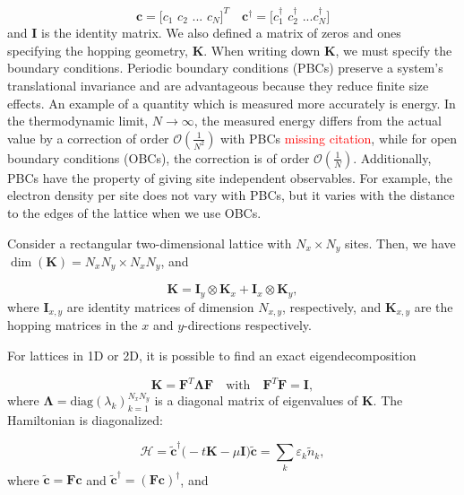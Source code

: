 \begin{equation}
\bm c = \bigg[ c_1 \,\, c_2 \,\, ... \,\, c_N \bigg]^T \quad \bm c^\dagger = \bigg[c_1^\dagger \,\, c_2^\dagger \,\, ... c_N^\dagger \bigg]
\end{equation}
and $\bm I$ is the identity matrix. We also defined a matrix of zeros and ones specifying the hopping geometry, $\bm K$. When writing down $\bm K$, we must specify the boundary conditions. Periodic boundary conditions (PBCs) preserve a system's translational invariance and are advantageous because they reduce finite size effects. An example of a quantity which is measured more accurately is energy. In the thermodynamic limit, $N \rightarrow \infty$, the measured energy differs from the actual value by a correction of order $\mathcal{O}(\frac{1}{N^2})$ with PBCs \textcolor{red}{missing citation}, while for open boundary conditions (OBCs), the correction is of order $\mathcal{O}(\frac{1}{N})$. Additionally, PBCs have the property of giving site independent observables. For example, the electron density per site does not vary with PBCs, but it varies with the distance to the edges of the lattice when we use OBCs.

Consider a rectangular two-dimensional lattice with $N_x \times N_y$ sites. Then, we have $\dim(\bm K) = N_x N_y \times N_x N_y $, and

\begin{equation}
\bm K = \bm I_y \otimes \bm K_x + \bm I_x \otimes \bm K_y ,
\end{equation}
where $\bm I_{x, y}$ are identity matrices of dimension $N_{x, y}$, respectively, and $\bm K_{x, y}$ are the hopping matrices in the $x$ and $y$-directions respectively.

For lattices in 1D or 2D, it is possible to find an exact eigendecomposition

\begin{equation}
\bm K = \bm F^T \bm \Lambda \bm F \quad \text{with}  \quad \bm F^T \bm F = \bm I ,
\end{equation}
where $\bm \Lambda = \text{diag}(\lambda_k)_{k = 1}^{N_x N_y}$ is a diagonal matrix of eigenvalues of $\bm K$. The Hamiltonian is diagonalized:

\begin{equation}\label{eq:quadraticH}
\mathcal{H} =\tilde{\bm c}^\dagger \big( -t \bm K - \mu \bm I \big) \tilde{\bm c} = \sum_k \varepsilon_k \tilde{n}_k ,
\end{equation}
where $\tilde{\bm c} = \bm F \bm c$ and $\tilde{\bm c}^\dagger = (\bm F \bm c)^\dagger$, and

